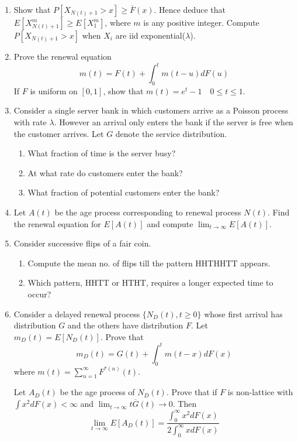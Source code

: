 \documentclass[a4paper,10pt]{article}
\begin{document}
\begin{enumerate}
	\item Show that $P[X_{N(t) + 1} > x] \geq \overline{F}(x)$. Hence deduce that $E[X_{N(t)+1}^m] \geq E[X_1^m]$, where $m$ is any positive integer. Compute $P[X_{N(t) + 1} > x]$ when $X_i$ are iid exponential($\lambda$).
	\item Prove the renewal equation
	\[m(t) = F(t) + \int_{0}^t m(t-u)dF(u)\]
	If $F$ is uniform on $[0,1]$, show that $m(t) = e^t -1 \quad 0\leq t \leq 1$.
\item Consider a single server bank in which customers arrive as a Poisson process with rate $\lambda$. However an arrival only enters the bank if the server is free when the customer arrives. Let $G$ denote the service distribution.
\begin{enumerate}
	\item What fraction of time is the server busy?
	\item At what rate do customers enter the bank?
	\item What fraction of potential customers enter the bank?
\end{enumerate}
\item Let $A(t)$ be the age process corresponding to renewal process $N(t)$. Find the renewal equation for $E[A(t)]$ and compute $\lim_{t \to \infty}E[A(t)]$.
\item Consider successive flips of a fair coin. 
\begin{enumerate}
	\item Compute the mean no. of flips till the pattern HHTHHTT appears.
	\item Which pattern, HHTT or HTHT, requires a longer expected time to occur?
\end{enumerate}

\item Consider a delayed renewal process $\{N_D(t), t\geq 0\}$ whose first arrival has distribution $G$ and the others have distribution $F$. Let $m_D(t) = E[N_D(t)]$. Prove that
\[m_D(t) = G(t) + \int_0^t m(t-x)dF(x)\]
where $m(t) = \sum_{n=1}^\infty F^{*(n)}(t)$.

Let $A_D(t)$ be the age process of $N_D(t)$. Prove that if $F$ is non-lattice with $\int x^2 dF(x) < \infty$ and $\lim_{t \to \infty}t\overline{G}(t) \to 0$. Then
\[\lim_{t \to \infty}E[A_D(t)]  = \frac{\int_0^\infty x^2 dF(x)}{2\int_0^\infty x dF(x)}\]


\end{enumerate}
\end{document}
